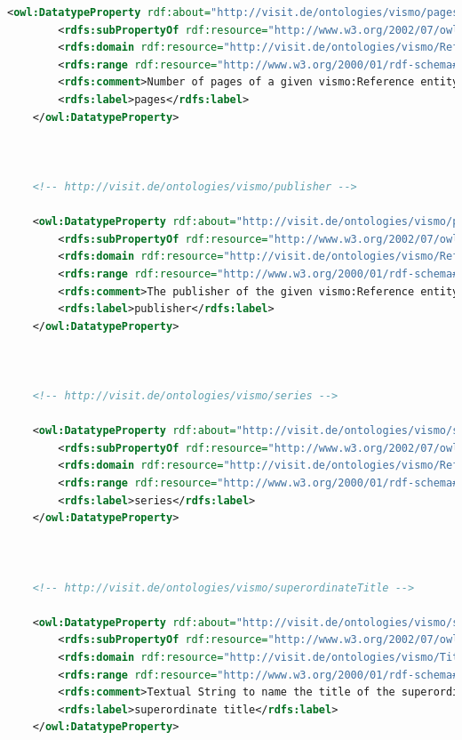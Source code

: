 \begin{lstlisting}[caption={VisMo Ontologie in der letzten (englischen) Version.},label={lst:vismo},captionpos=b,language=xml]
    <owl:DatatypeProperty rdf:about="http://visit.de/ontologies/vismo/pages">
        <rdfs:subPropertyOf rdf:resource="http://www.w3.org/2002/07/owl#topDataProperty"/>
        <rdfs:domain rdf:resource="http://visit.de/ontologies/vismo/Reference"/>
        <rdfs:range rdf:resource="http://www.w3.org/2000/01/rdf-schema#Literal"/>
        <rdfs:comment>Number of pages of a given vismo:Reference entity.</rdfs:comment>
        <rdfs:label>pages</rdfs:label>
    </owl:DatatypeProperty>
    


    <!-- http://visit.de/ontologies/vismo/publisher -->

    <owl:DatatypeProperty rdf:about="http://visit.de/ontologies/vismo/publisher">
        <rdfs:subPropertyOf rdf:resource="http://www.w3.org/2002/07/owl#topDataProperty"/>
        <rdfs:domain rdf:resource="http://visit.de/ontologies/vismo/Reference"/>
        <rdfs:range rdf:resource="http://www.w3.org/2000/01/rdf-schema#Literal"/>
        <rdfs:comment>The publisher of the given vismo:Reference entity.</rdfs:comment>
        <rdfs:label>publisher</rdfs:label>
    </owl:DatatypeProperty>
    


    <!-- http://visit.de/ontologies/vismo/series -->

    <owl:DatatypeProperty rdf:about="http://visit.de/ontologies/vismo/series">
        <rdfs:subPropertyOf rdf:resource="http://www.w3.org/2002/07/owl#topDataProperty"/>
        <rdfs:domain rdf:resource="http://visit.de/ontologies/vismo/Reference"/>
        <rdfs:range rdf:resource="http://www.w3.org/2000/01/rdf-schema#Literal"/>
        <rdfs:label>series</rdfs:label>
    </owl:DatatypeProperty>
    


    <!-- http://visit.de/ontologies/vismo/superordinateTitle -->

    <owl:DatatypeProperty rdf:about="http://visit.de/ontologies/vismo/superordinateTitle">
        <rdfs:subPropertyOf rdf:resource="http://www.w3.org/2002/07/owl#topDataProperty"/>
        <rdfs:domain rdf:resource="http://visit.de/ontologies/vismo/Title"/>
        <rdfs:range rdf:resource="http://www.w3.org/2000/01/rdf-schema#Literal"/>
        <rdfs:comment>Textual String to name the title of the superordinate reference collection that incorporates the associated vismo:Reference entity.</rdfs:comment>
        <rdfs:label>superordinate title</rdfs:label>
    </owl:DatatypeProperty>
    



\end{lstlisting}
